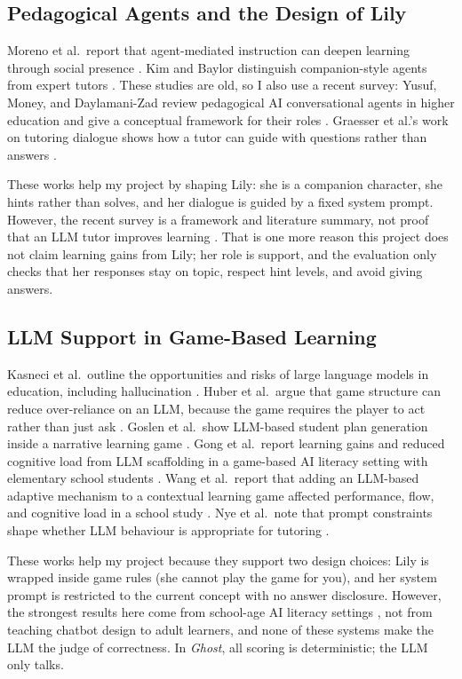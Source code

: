 \documentclass[11pt,a4paper]{article}
\begin{document}
\subsection{Pedagogical Agents and the Design of Lily}

Moreno et al.\ report that agent-mediated instruction can deepen learning through social presence \cite{moreno2001}. Kim and Baylor distinguish companion-style agents from expert tutors \cite{kimbaylor2006}. These studies are old, so I also use a recent survey: Yusuf, Money, and Daylamani-Zad review pedagogical AI conversational agents in higher education and give a conceptual framework for their roles \cite{yusuf2025}. Graesser et al.'s work on tutoring dialogue shows how a tutor can guide with questions rather than answers \cite{graesser2001}.

These works help my project by shaping Lily: she is a companion character, she hints rather than solves, and her dialogue is guided by a fixed system prompt. However, the recent survey is a framework and literature summary, not proof that an LLM tutor improves learning \cite{yusuf2025}. That is one more reason this project does not claim learning gains from Lily; her role is support, and the evaluation only checks that her responses stay on topic, respect hint levels, and avoid giving answers.

\subsection{LLM Support in Game-Based Learning}

Kasneci et al.\ outline the opportunities and risks of large language models in education, including hallucination \cite{kasneci2023}. Huber et al.\ argue that game structure can reduce over-reliance on an LLM, because the game requires the player to act rather than just ask \cite{huber2024}. Goslen et al.\ show LLM-based student plan generation inside a narrative learning game \cite{goslen2025}. Gong et al.\ report learning gains and reduced cognitive load from LLM scaffolding in a game-based AI literacy setting with elementary school students \cite{gong2026}. Wang et al.\ report that adding an LLM-based adaptive mechanism to a contextual learning game affected performance, flow, and cognitive load in a school study \cite{wang2025}. Nye et al.\ note that prompt constraints shape whether LLM behaviour is appropriate for tutoring \cite{nye2023}.

These works help my project because they support two design choices: Lily is wrapped inside game rules (she cannot play the game for you), and her system prompt is restricted to the current concept with no answer disclosure. However, the strongest results here come from school-age AI literacy settings \cite{gong2026,wang2025}, not from teaching chatbot design to adult learners, and none of these systems make the LLM the judge of correctness. In \textit{Ghost}, all scoring is deterministic; the LLM only talks.
\end{document}
